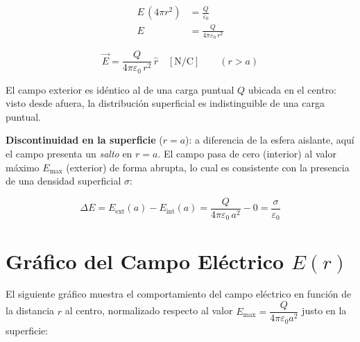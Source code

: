 \documentclass[12pt,letterpaper]{article}
\begin{document}
\begin{align*}
    E\,(4\pi r^2) &= \frac{Q}{\varepsilon_0} \\[8pt]
    E             &= \frac{Q}{4\pi\varepsilon_0\,r^2}
\end{align*}

\[
    \boxed{\vec{E} = \frac{Q}{4\pi\varepsilon_0\,r^2}\,\hat{r}
    \quad [\text{N/C}] \qquad (r > a)}
\]

\smallskip
\noindent El campo exterior es id\'entico al de una carga puntual $Q$ ubicada en
el centro: visto desde afuera, la distribuci\'on superficial es indistinguible
de una carga puntual.

\bigskip

\textbf{Discontinuidad en la superficie} ($r = a$): a diferencia de la esfera
aislante, aqu\'i el campo presenta un \textit{salto} en $r = a$. El campo pasa
de cero (interior) al valor m\'aximo $E_{\max}$ (exterior) de forma abrupta,
lo cual es consistente con la presencia de una densidad superficial $\sigma$:

\[
    \Delta E = E_\text{ext}(a) - E_\text{int}(a)
             = \frac{Q}{4\pi\varepsilon_0\,a^2} - 0
             = \frac{\sigma}{\varepsilon_0}
\]

\clearpage
\section*{Gr\'afico del Campo El\'ectrico $E(r)$}

El siguiente gr\'afico muestra el comportamiento del campo el\'ectrico en funci\'on
de la distancia $r$ al centro, normalizado respecto al valor
$E_{\max} = \dfrac{Q}{4\pi\varepsilon_0 a^2}$ justo en la superficie:
\end{document}
